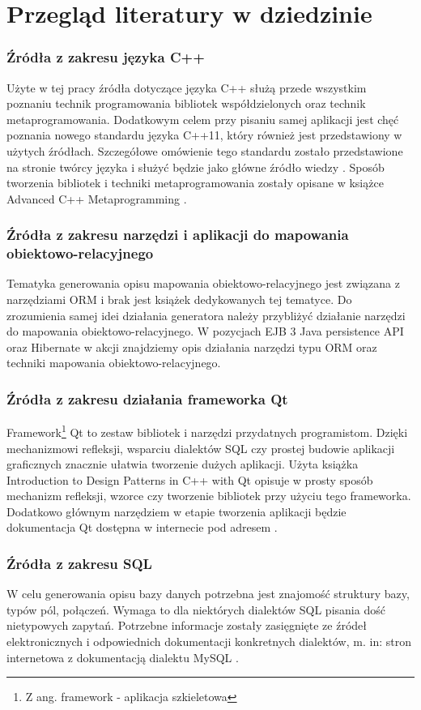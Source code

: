 \documentclass[12pt]{report}
\begin{document}
\section{Przegląd literatury w dziedzinie}
\subsubsection{Źródła z zakresu języka C++}
	\indent Użyte w tej pracy źródła dotyczące języka C++ służą przede wszystkim poznaniu technik programowania bibliotek współdzielonych oraz technik metaprogramowania. Dodatkowym celem przy pisaniu samej aplikacji jest chęć poznania nowego standardu języka C++11, który również jest przedstawiony w użytych źródłach. Szczegółowe omówienie tego standardu zostało przedstawione na stronie twórcy języka i służyć będzie jako główne źródło wiedzy \cite{strostrup}.
Sposób tworzenia bibliotek i techniki metaprogramowania zostały opisane w książce Advanced C++ Metaprogramming \cite{c++2}.
\subsubsection{Źródła z zakresu narzędzi i aplikacji do mapowania obiektowo-relacyjnego}
	\indent Tematyka generowania opisu mapowania obiektowo-relacyjnego jest związana z narzędziami ORM i brak jest książek dedykowanych tej tematyce. Do zrozumienia samej idei działania generatora należy przybliżyć działanie narzędzi do mapowania obiektowo-relacyjnego. W pozycjach EJB 3 Java persistence API \cite{ejb} oraz Hibernate w akcji \cite{hibernateInAction}
znajdziemy opis działania narzędzi typu ORM oraz techniki mapowania obiektowo-relacyjnego.
\subsubsection{Źródła z zakresu działania frameworka Qt}
	\indent Framework\footnote{Z ang. framework - aplikacja szkieletowa} Qt to zestaw bibliotek i narzędzi przydatnych programistom. Dzięki mechanizmowi refleksji, wsparciu dialektów SQL czy prostej budowie aplikacji graficznych znacznie ułatwia tworzenie dużych aplikacji. Użyta książka Introduction to Design Patterns in C++ with Qt \cite{c++patterns}
opisuje w prosty sposób mechanizm refleksji, wzorce czy tworzenie bibliotek przy użyciu tego frameworka.
Dodatkowo głównym narzędziem w etapie tworzenia aplikacji będzie dokumentacja Qt dostępna w internecie pod adresem \cite{qtframework}.
\subsubsection{Źródła z zakresu SQL}
	\indent W celu generowania opisu bazy danych potrzebna jest znajomość struktury bazy, typów pól, połączeń. Wymaga to dla niektórych dialektów SQL pisania dość nietypowych zapytań. Potrzebne informacje zostały zasięgnięte ze źródeł elektronicznych i odpowiednich dokumentacji konkretnych dialektów, m. in: stron internetowa z dokumentacją dialektu MySQL \cite{mysqlweb}.
\end{document}
